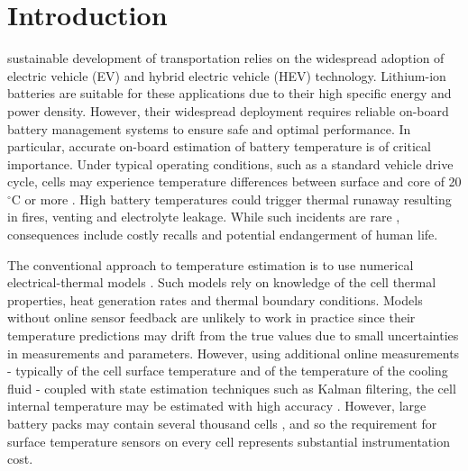 \documentclass[journal, english]{IEEEtran}
\begin{document}
\section{Introduction\label{sec:Introduction}}
 sustainable development of transportation relies on the widespread adoption of electric vehicle (EV) and hybrid electric vehicle (HEV) technology. Lithium-ion batteries are suitable for these applications due to their high specific energy and power density. However, their widespread deployment requires reliable on-board battery management systems to ensure  safe and optimal performance. In particular, accurate on-board estimation of battery temperature is of critical importance.
Under typical operating conditions, such as a standard vehicle drive cycle,
cells may experience temperature differences between surface and core
of 20 $^{\circ}$C or more \cite{Kim2009}. High battery temperatures
could trigger thermal runaway resulting in fires,
venting and electrolyte leakage. While such incidents are rare \cite{Wang2012a},
consequences include costly recalls and potential endangerment of
human life.


The conventional approach to temperature estimation is to use numerical
electrical-thermal models \cite{Forgez2010a,Kim2014b,Lin2013f,Kim2013,Lin2014}.
Such models rely on knowledge of the cell thermal properties, heat
generation rates and thermal boundary conditions. Models without online sensor
feedback are unlikely to work in practice since their temperature
predictions may drift from the true values due to small uncertainties
in measurements and parameters. However, using additional online measurements - typically of the cell surface temperature and of the temperature
of the cooling fluid - coupled with state estimation techniques such
as Kalman filtering, the cell internal temperature may be estimated
with high accuracy \cite{Kim2014b,Lin2013f,Kim2013,Lin2014}. However,
large battery packs may contain several thousand cells \cite{Pesaran2009},
and so the requirement for surface temperature sensors on every cell
represents substantial instrumentation cost.
\end{document}
